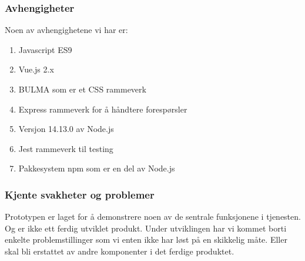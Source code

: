 \subsubsection{Avhengigheter}
Noen av avhengighetene vi har er: 
\begin{enumerate}
    \item Javascript ES9 

    \item Vue.js 2.x

    \item BULMA som er et CSS rammeverk 

    \item Express rammeverk for å håndtere forespørsler 

    \item Versjon 14.13.0 av Node.js 

    \item  Jest rammeverk til testing 

    \item Pakkesystem npm som er en del av Node.js 
\end{enumerate}




\subsubsection{Kjente svakheter og problemer}

Prototypen er laget for å demonstrere noen av de sentrale funksjonene i tjenesten. Og er ikke ett ferdig utviklet produkt. Under utviklingen har vi kommet borti enkelte problemstillinger som vi enten ikke har løst på en skikkelig måte. Eller skal bli erstattet av andre komponenter i det ferdige produktet.


